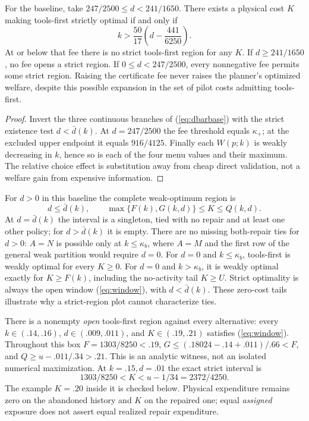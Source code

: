 \begin{corollary}
For the baseline, take $247/2500\leq d<241/1650$. There exists a physical cost $K$ making tools-first strictly optimal if and only if
\[
 k>\frac{50}{17}\left(d-\frac{441}{6250}\right).
\]
At or below that fee there is no strict tools-first region for any $K$. If $d\geq241/1650$, no fee opens a strict region. If $0\leq d<247/2500$, every nonnegative fee permits some strict region. Raising the certificate fee never raises the planner's optimized welfare, despite this possible expansion in the set of pilot costs admitting tools-first.
\end{corollary}
\begin{proof}
Invert the three continuous branches of (\ref{eq:dbarbase}) with the strict existence test $d<\bar d(k)$. At $d=247/2500$ the fee threshold equals $\kappa_+$; at the excluded upper endpoint it equals $916/4125$. Finally each $W(p;k)$ is weakly decreasing in $k$, hence so is each of the four menu values and their maximum. The relative choice effect is substitution away from cheap direct validation, not a welfare gain from expensive information.
\end{proof}

For $d>0$ in this baseline the complete weak-optimum region is
\[
 d\leq\bar d(k),\qquad \max\{F(k),G(k,d)\}\leq K\leq Q(k,d).
\]
At $d=\bar d(k)$ the interval is a singleton, tied with no repair and at least one other policy; for $d>\bar d(k)$ it is empty. There are no missing both-repair ties for $d>0$: $A=N$ is possible only at $k\leq\kappa_b$, where $A=M$ and the first row of the general weak partition would require $d=0$. For $d=0$ and $k\leq\kappa_b$, tools-first is weakly optimal for every $K\geq0$. For $d=0$ and $k>\kappa_b$, it is weakly optimal exactly for $K\geq F(k)$, including the no-activity tail $K\geq U$. Strict optimality is always the open window (\ref{eq:window}), with $d<\bar d(k)$. These zero-cost tails illustrate why a strict-region plot cannot characterize ties.

There is a nonempty \emph{open} tools-first region against every alternative: every $k\in(.14,.16)$, $d\in(.009,.011)$, and $K\in(.19,.21)$ satisfies (\ref{eq:window}). Throughout this box $F=1303/8250<.19$, $G\leq(.18024-.14+.011)/.66< F$, and $Q\geq u-.011/.34>.21$. This is an analytic witness, not an isolated numerical maximization. At $k=.15,d=.01$ the exact strict interval is
\[
 1303/8250<K< u-1/34=2372/4250.
\]
The example $K=.20$ inside it is checked below. Physical expenditure remains zero on the abandoned history and $K$ on the repaired one; equal \emph{assigned} exposure does not assert equal realized repair expenditure.

